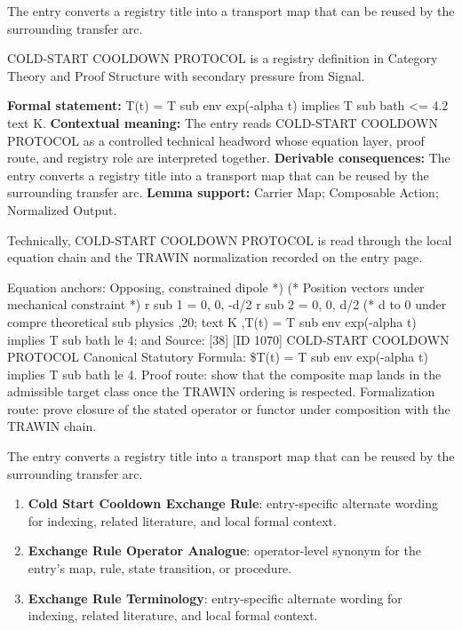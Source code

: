The entry converts a registry title into a transport map that can be reused by the surrounding transfer arc.
\clearpage


\begingroup\small
{}
COLD-START COOLDOWN PROTOCOL is a registry definition in Category Theory and Proof Structure with secondary pressure from Signal.

\begingroup\footnotesize\setlength{\emergencystretch}{3em}\sloppy
\textbf{Formal statement:} T(t) = T sub env exp(-alpha t) implies T sub bath <= 4.2 text K. \textbf{Contextual meaning:} The entry reads COLD-START COOLDOWN PROTOCOL as a controlled technical headword whose equation layer, proof route, and registry role are interpreted together. \textbf{Derivable consequences:} The entry converts a registry title into a transport map that can be reused by the surrounding transfer arc. \textbf{Lemma support:} Carrier Map; Composable Action; Normalized Output.\par
\endgroup

Technically, COLD-START COOLDOWN PROTOCOL is read through the local equation chain and the TRAWIN normalization recorded on the entry page.

Equation anchors: Opposing, constrained dipole *) (* Position vectors under mechanical constraint *) r sub 1 = 0, 0, -d/2 r sub 2 = 0, 0, d/2 (* d to 0 under compre theoretical sub physics ,20; text K ,T(t) = T sub env exp(-alpha t) implies T sub bath le 4; and Source: [38] [ID 1070] COLD-START COOLDOWN PROTOCOL Canonical Statutory Formula: \$T(t) = T sub env exp(-alpha t) implies T sub bath le 4. Proof route: show that the composite map lands in the admissible target class once the TRAWIN ordering is respected. Formalization route: prove closure of the stated operator or functor under composition with the TRAWIN chain.

The entry converts a registry title into a transport map that can be reused by the surrounding transfer arc.
\endgroup

\begin{enumerate}[leftmargin=1.6em,itemsep=6pt,topsep=4pt]
\item \textbf{Cold Start Cooldown Exchange Rule}: entry-specific alternate wording for indexing, related literature, and local formal context.
\item \textbf{Exchange Rule Operator Analogue}: operator-level synonym for the entry's map, rule, state transition, or procedure.
\item \textbf{Exchange Rule Terminology}: entry-specific alternate wording for indexing, related literature, and local formal context.
\end{enumerate}

